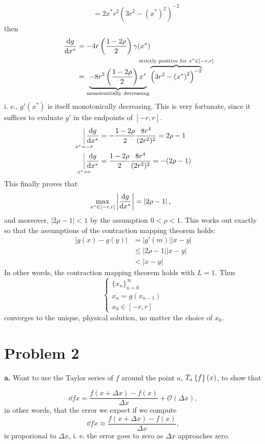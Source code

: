 \documentclass[12pt]{article}
\newcommand{\subtask}[1]{{\bf #1.}}
\begin{document}
\begin{multicols}{2}
\begin{align*}
    &=
    2 x^* r^2 \left(3r^2 - \left(x^*\right)^2\right)^{-2}
\end{align*}
then
\begin{align*}
    \dd{g}{x^*} &=
    -4r
    \left(
    \frac{1 - 2\rho}{2}
    \right) \gamma(x^*) \\
    &=
    \underbrace{
    -8r^3
    \left(
    \frac{1 - 2\rho}{2}
    \right) x^*}
_\text{monotonically decreasing}
    \overbrace{\left(3r^2 - \left(x^*\right)^2\right)^{-2}}
    ^{\mathclap{\text{strictly positive for } x^* \in [-r, r]}}
\end{align*}
i. e., $g'(x^*)$ is itself monotonically decreasing.
This is very fortunate, since it suffices to evaluate
$g'$ in the endpoints of $[-r, r]$.
\begin{align*}
    \smashoperator[r]{\Sub \limits_{x^* = -r}} \dd{g}{x^*} &=
    -\frac{1 - 2\rho}{2}\frac{8r^4}{(2r^2)^2} = 2\rho - 1 \\
    \smashoperator[r]{\Sub \limits_{x^* = r}} \dd{g}{x^*} &=
    \frac{1 - 2\rho}{2}\frac{8r^4}{(2r^2)^2} = -(2\rho - 1)
\end{align*}
This finally proves that
\[
    \smashoperator[l]{\max_{x^* \in [-r, r]}} \left|\dd{g}{x^*}\right| = |2\rho - 1|
    \,\text,
\]
and moreover, $|2\rho - 1| < 1$ by the assumption ${0 < \rho < 1}$.
This works out exactly so that the assumptions of the contraction mapping theorem holds:
\begin{align*}
    |g(x) - g(y)| &= |g'(m)||x - y|
    \tag*{\footnotesize\scshape mean value theorem} \\
    &\leq |2\rho - 1||x - y| \\
    &< |x - y|
\end{align*}
In other words, the contraction mapping theorem
holds with $L = 1$.
Thus
\[
    \left\{\begin{array}{l}
        \big\{ x_n \big\}_{n = 0}^{\infty} \\
        x_n = g \left( x_{n-1} \right) \\
        x_0 \in [-r, r]
    \end{array}\right.
\]
converges to the unique, physical solution, no matter the choice of $x_0$.


\section*{Problem 2}
\subtask{a} Want to use the Taylor series of $f$ around the point $a$,
$\Tay{f}{a}{x}$, to show that

\[
    \dd{f}{x} = \frac{f(x + \Delta x) - f(x)}{\Delta x} + {\mathcal O}(\Delta x),
\]
in other words, that the error we expect if we compute
\[
    \dd{f}{x} \approx \frac{f(x + \Delta x) - f(x)}{\Delta x},
\]
is proporional to $\Delta x$, i. e. the error goes to zero
as $\Delta x$ approaches zero.


\end{multicols}
\end{document}

